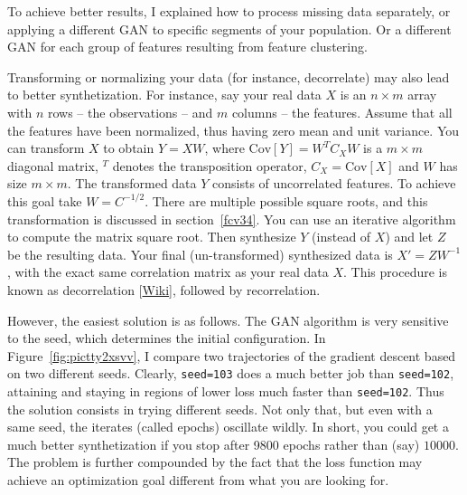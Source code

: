 \documentclass[oneside,10pt]{book}
\begin{document}
To achieve better results, I explained how to process missing data separately, or applying a different GAN to specific segments of your
 population. Or a different GAN for each group of features resulting from \textcolor{index}{feature clustering}.

 Transforming or normalizing your data (for instance, decorrelate) may also lead to better synthetization. For instance, say your real
 data $X$ is an $n\times m$ array with $n$ rows -- the observations -- and $m$ columns -- the features. Assume that all the features have been normalized, thus having zero mean and unit variance. You can transform $X$ to obtain $Y=XW$, where
 $\text{Cov}[Y]= W^T C_X W$ is a $m \times m$ diagonal matrix, $^T$ denotes the transposition operator, $C_X=\text{Cov}[X]$ and $W$ has size $m\times m$. The transformed data $Y$ consists of uncorrelated features. To achieve this goal take $W=C^{-1/2}$. There are multiple possible square roots, and this transformation is discussed in section~\ref{fcv34}. You can use an iterative algorithm to compute the
 \textcolor{index}{matrix square root}. Then synthesize $Y$ (instead of $X$) and let $Z$ be the resulting data. Your final (un-transformed) synthesized data  is $X'=ZW^{-1}$, with the exact same correlation matrix as your real data $X$.
 This procedure is known as \textcolor{index}{decorrelation} [\href{https://en.wikipedia.org/wiki/Decorrelation}{Wiki}], followed by recorrelation.

However, the easiest solution is as follows. The GAN algorithm is very sensitive to the
\textcolor{index}{seed}, which determines the initial configuration. In Figure~\ref{fig:pictty2xsvv}, I  compare two trajectories of the gradient descent
 based on two different seeds. Clearly, \texttt{seed=103} does a much better job than \texttt{seed=102}, attaining
 and staying in regions of lower loss much faster than \texttt{seed=102}. Thus the solution consists in trying different seeds. Not only that, but even with a same seed, the iterates (called \textcolor{index}{epochs}) oscillate wildly. In short, you could get
 a much better synthetization if you stop after 9800 epochs rather than (say) $\num{10000}$. The problem is
 further compounded by the fact that the \textcolor{index}{loss function} may achieve an optimization goal different from what you are looking for.
\end{document}
